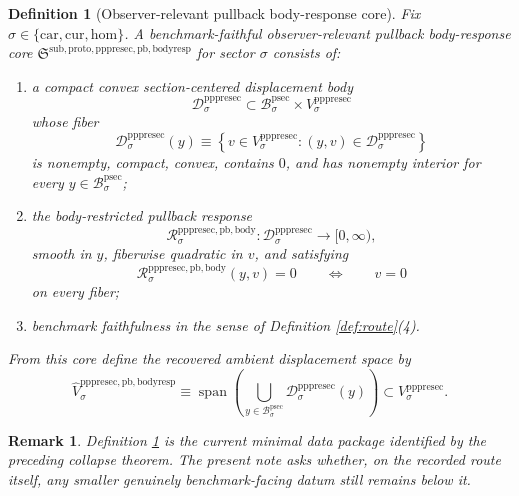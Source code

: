 \documentclass[11pt]{article}
\newcommand{\Car}{\mathrm{car}}
\newcommand{\Cur}{\mathrm{cur}}
\newcommand{\Hom}{\mathrm{hom}}
\newcommand{\ProtoSectionBody}[1]{\mathcal B_{#1}^{\mathrm{psec}}}
\newcommand{\PrePreProtoSectionVertical}[1]{V_{#1}^{\mathrm{pppresec}}}
\newcommand{\PrePreProtoSectionResidualBody}[1]{\mathcal D_{#1}^{\mathrm{pppresec}}}
\newcommand{\PrePreProtoSectionBodyResponse}[1]{\mathscr R_{#1}^{\mathrm{pppresec,pb,body}}}
\newcommand{\PullbackBodyResponseCore}{\mathfrak S^{\mathrm{sub,proto,pppresec,pb,bodyresp}}}
\newcommand{\RecoveredBodyResponseSpace}[1]{\widehat V_{#1}^{\mathrm{pppresec,pb,bodyresp}}}
\newtheorem{definition}{Definition}
\newtheorem{remark}{Remark}
\begin{document}
\begin{definition}[Observer-relevant pullback body-response core]
\label{def:bodyresp}
Fix \(\sigma\in\{\Car,\Cur,\Hom\}\). A \emph{benchmark-faithful observer-relevant pullback body-response core} \(\PullbackBodyResponseCore\) for sector \(\sigma\) consists of:
\begin{enumerate}
    \item a compact convex section-centered displacement body
    \[
    \PrePreProtoSectionResidualBody{\sigma}
    \subset
    \ProtoSectionBody{\sigma}\times\PrePreProtoSectionVertical{\sigma}
    \]
    whose fiber
    \[
    \PrePreProtoSectionResidualBody{\sigma}(y)
    \equiv
    \left\{
    v\in\PrePreProtoSectionVertical{\sigma}:(y,v)\in\PrePreProtoSectionResidualBody{\sigma}
    \right\}
    \]
    is nonempty, compact, convex, contains \(0\), and has nonempty interior for every \(y\in\ProtoSectionBody{\sigma}\);
    \item the body-restricted pullback response
    \[
    \PrePreProtoSectionBodyResponse{\sigma}:
    \PrePreProtoSectionResidualBody{\sigma}\to[0,\infty),
    \]
    smooth in \(y\), fiberwise quadratic in \(v\), and satisfying
    \[
    \PrePreProtoSectionBodyResponse{\sigma}(y,v)=0
    \qquad\Longleftrightarrow\qquad
    v=0
    \]
    on every fiber;
    \item benchmark faithfulness in the sense of Definition \ref{def:route}(4).
\end{enumerate}
From this core define the recovered ambient displacement space by
\[
\RecoveredBodyResponseSpace{\sigma}
\equiv
\operatorname{span}\left(
\bigcup_{y\in\ProtoSectionBody{\sigma}}
\PrePreProtoSectionResidualBody{\sigma}(y)
\right)
\subset
\PrePreProtoSectionVertical{\sigma}.
\]
\end{definition}

\begin{remark}
Definition \ref{def:bodyresp} is the current minimal data package identified by the preceding collapse theorem. The present note asks whether, on the recorded route itself, any smaller genuinely benchmark-facing datum still remains below it.
\end{remark}
\end{document}
